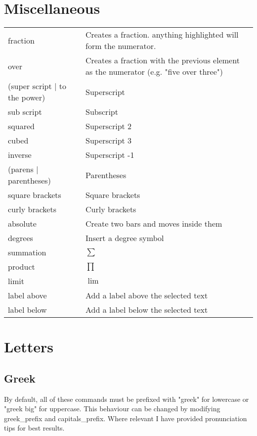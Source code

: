 \documentclass[12pt]{article}
\begin{document}
\section{Miscellaneous}
\begin{tabularx}{\linewidth}{ l X}
fraction & Creates a fraction. anything highlighted will form the numerator. \\
over & Creates a fraction with the previous element as the numerator (e.g. "five over three") \\
(super script | to the power) & Superscript \\
sub script & Subscript \\
squared & Superscript 2 \\
cubed & Superscript 3 \\
inverse & Superscript -1 \\
(parens | parentheses) & Parentheses \\
square brackets & Square brackets \\
curly brackets & Curly brackets \\
absolute & Create two bars and moves inside them \\
degrees & Insert a degree symbol \\
summation & $\sum$ \\
product & $\prod$ \\
limit & $\lim$ \\
label above & Add a label above the selected text \\
label below & Add a label below the selected text \\
\end{tabularx}


\section{Letters}
\subsection{Greek}
By default, all of these commands must be prefixed with "greek" for lowercase or "greek big" for uppercase. This behaviour can be changed by modifying greek\_prefix and capitals\_prefix. Where relevant I have provided pronunciation tips for best results.
\end{document}
